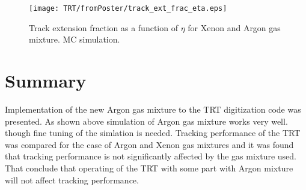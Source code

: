 \begin{figure}
\begin{center}
 \texttt{[image: TRT/fromPoster/track\_ext\_frac\_eta.eps]}
\caption{Track extension fraction as a function of $\eta$ for Xenon and Argon gas mixture. MC simulation.}
\label{fig:track_ext_fraction}
\end{center}
\end{figure}

\section{Summary}

Implementation of the new Argon gas mixture to the TRT digitization code was presented. As shown above simulation of Argon gas mixture works very well. though 
fine tuning of the simlation is needed.
Tracking performance of the TRT was compared for the case of Argon and Xenon gas mixtures and it was found that tracking performance is not significantly affected
by the gas mixture used. That conclude that operating of the TRT with some part with Argon mixture will not affect tracking performance.



